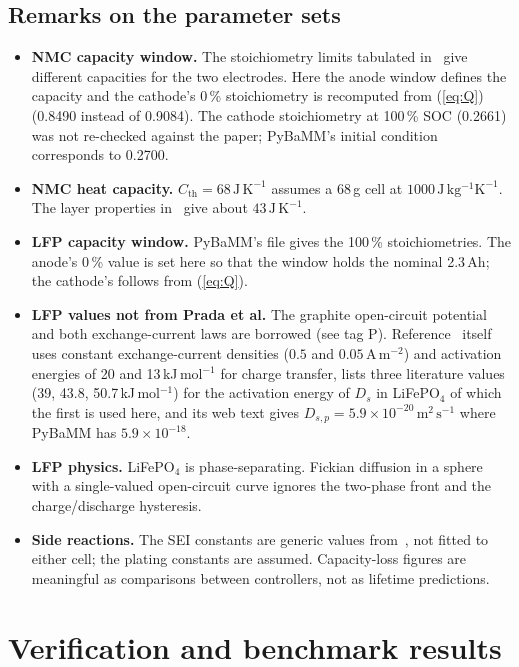 \documentclass[11pt]{article}
\newcommand{\unit}[1]{\,\mathrm{#1}}
\begin{document}
\subsection{Remarks on the parameter sets}
\begin{itemize}[leftmargin=*]
\item \textbf{NMC capacity window.} The stoichiometry limits tabulated in~\cite{chen2020} give different capacities for the two electrodes. Here the anode window defines the capacity and the cathode's 0\,\% stoichiometry is recomputed from (\ref{eq:Q}) (0.8490 instead of 0.9084). The cathode stoichiometry at 100\,\% SOC (0.2661) was not re-checked against the paper; PyBaMM's initial condition corresponds to 0.2700.
\item \textbf{NMC heat capacity.} $C_{\mathrm{th}}=68\unit{J\,K^{-1}}$ assumes a 68\,g cell at $1000\unit{J\,kg^{-1}K^{-1}}$. The layer properties in~\cite{chen2020} give about $43\unit{J\,K^{-1}}$.
\item \textbf{LFP capacity window.} PyBaMM's file gives the 100\,\% stoichiometries. The anode's 0\,\% value is set here so that the window holds the nominal 2.3\,Ah; the cathode's follows from (\ref{eq:Q}).
\item \textbf{LFP values not from Prada et al.} The graphite open-circuit potential and both exchange-current laws are borrowed (see tag P). Reference~\cite{prada2012} itself uses constant exchange-current densities ($0.5$ and $0.05\unit{A\,m^{-2}}$) and activation energies of 20 and 13\,kJ\,mol$^{-1}$ for charge transfer, lists three literature values (39, 43.8, 50.7\,kJ\,mol$^{-1}$) for the activation energy of $D_s$ in LiFePO$_4$ of which the first is used here, and its web text gives $D_{s,p}=5.9\times10^{-20}\unit{m^2\,s^{-1}}$ where PyBaMM has $5.9\times10^{-18}$.
\item \textbf{LFP physics.} LiFePO$_4$ is phase-separating. Fickian diffusion in a sphere with a single-valued open-circuit curve ignores the two-phase front and the charge/discharge hysteresis.
\item \textbf{Side reactions.} The SEI constants are generic values from~\cite{okane2022}, not fitted to either cell; the plating constants are assumed. Capacity-loss figures are meaningful as comparisons between controllers, not as lifetime predictions.
\end{itemize}

\section{Verification and benchmark results}\label{sec:verification}
\end{document}
